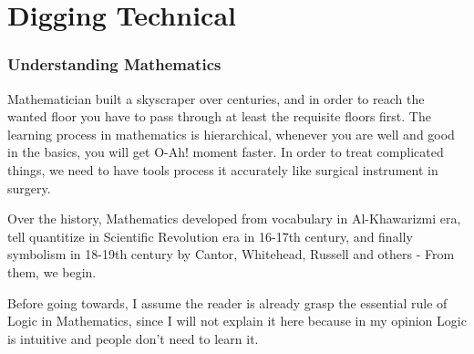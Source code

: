 \part{Digging Technical}

\section{Understanding Mathematics}
Mathematician built a skyscraper over centuries, and in order to reach the wanted floor you have to pass through at least the requisite floors first. The learning process in mathematics is hierarchical, whenever you are well and good in the basics, you will get O-Ah! moment faster. In order to treat complicated things, we need to have tools process it accurately like surgical instrument in surgery. 

Over the history, Mathematics developed from vocabulary in Al-Khawarizmi era,  tell quantitize in Scientific Revolution era in 16-17th century, and finally symbolism in 18-19th century by Cantor, Whitehead, Russell and others - From them, we begin.

Before going towards, I assume the reader is already grasp the essential rule of Logic in Mathematics, since I will not explain it here because in my opinion Logic is intuitive and people don't need to learn it.